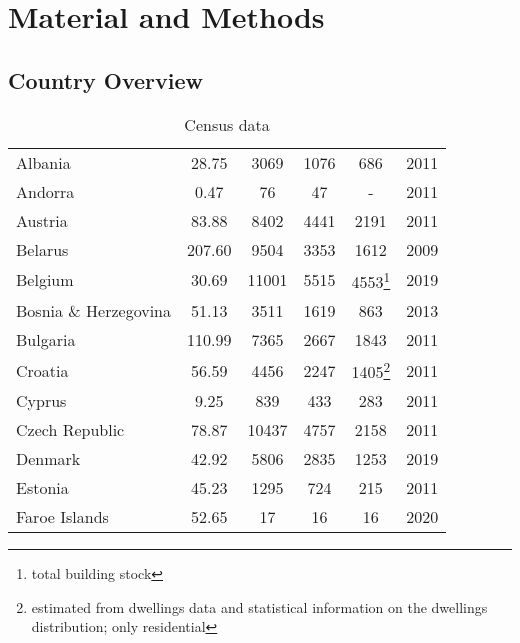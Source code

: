 \documentclass[final, 3p, times, 12pt]{elsarticle} %
\begin{document}
\section{Material and Methods}\label{sec:material}
\subsection{Country Overview}

\begin{table}
\caption[]{Census data}
\begin{minipage}{\textwidth}
\small
\begin{center}
\begin{tabular}{ |l|S[table-format=4.2]|S[table-format=5.0]|S[table-format=5.0]|S[table-format=5.0]|c|}
 \hline
  & {} & {} & {} & {} & \\
 \hline
 Albania & 28.75 & 3069 & 1076 & 686 & 2011\\
 Andorra & 0.47 & 76 & 47 & {-} & 2011\\
 Austria & 83.88 & 8402 & 4441 & 2191 & 2011\\
 Belarus & 207.60 & 9504 & 3353 & 1612 & 2009\\
 Belgium & 30.69 & 11001 & 5515 & 4553{\footnote{total building stock\label{fn:totbdstock}}} & 2019\\
 Bosnia \& Herzegovina & 51.13 & 3511 & 1619 & 863 & 2013\\
 Bulgaria & 110.99 & 7365 & 2667 & 1843 & 2011\\
 Croatia & 56.59 & 4456 & 2247 & 1405\footnote{estimated from dwellings data and statistical information on the dwellings distribution; only residential\label{fn:estbd}} & 2011\\
 Cyprus & 9.25 & 839 & 433 & 283 & 2011\\
 Czech Republic & 78.87 & 10437 & 4757 & 2158 & 2011\\
 Denmark & 42.92 & 5806 & 2835 & 1253 & 2019\\
 Estonia & 45.23 & 1295 & 724 & 215 & 2011\\
 Faroe Islands & 52.65 & 17 & 16 & 16 & 2020\\

\end{tabular}
\end{center}
\end{minipage}
\end{table}
\end{document}
